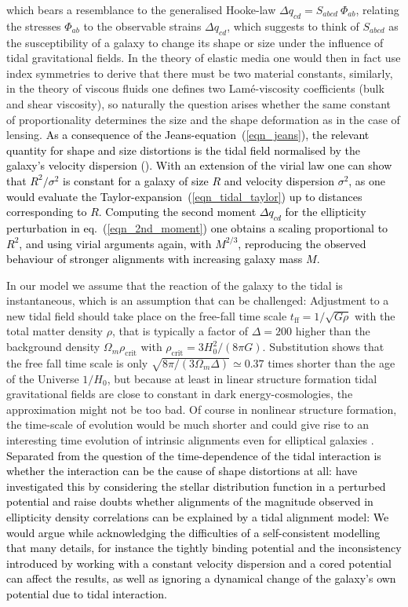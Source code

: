 \documentclass[a4paper,fleqn,usenatbib]{mnras}
\newcommand\spirou[1]{\textcolor{black}{#1}}
\begin{document}
which bears a resemblance to the generalised Hooke-law $\Delta q_{cd} = S_{abcd}\:\Phi_{ab}$, relating the stresses $\Phi_{ab}$ to the observable strains $\Delta q_{cd}$, which suggests to think of $S_{abcd}$ as the susceptibility of a galaxy to change its shape or size under the influence of tidal gravitational fields. In the theory of elastic media one would then in fact use index symmetries to derive that there must be two material constants, similarly, in the theory of viscous fluids one defines two Lam{\'e}-viscosity coefficients (bulk and shear viscosity), so naturally the question arises whether the same constant of proportionality determines the size and the shape deformation as in the case of lensing. \spirou{As a consequence of the Jeans-equation~(\ref{eqn_jeans}), the relevant quantity for shape and size distortions is the tidal field normalised by the galaxy's velocity dispersion (\citet{camelio_origin_2015,piras_mass_2018}). With an extension of the virial law one can show that $R^2/\sigma^2$ is constant for a galaxy of size $R$ and velocity dispersion $\sigma^2$, as one would evaluate the Taylor-expansion~(\ref{eqn_tidal_taylor}) up to distances corresponding to $R$. Computing the second moment $\Delta q_{cd}$ for the ellipticity perturbation in eq.~(\ref{eqn_2nd_moment}) one obtains a scaling proportional to $R^2$, and using virial arguments again, with $M^{2/3}$, reproducing the observed behaviour of stronger alignments with increasing galaxy mass $M$.}

In our model we assume that the reaction of the galaxy to the tidal is instantaneous, which is an assumption that can be challenged: Adjustment to a new tidal field should take place on the free-fall time scale $t_\mathrm{ff} = 1/\sqrt{G\rho}$ with the total matter density $\rho$, that is typically a factor of $\Delta = 200$ higher than the background density $\Omega_m\rho_\mathrm{crit}$ with $\rho_\mathrm{crit} = 3H_0^2/(8\pi G)$. Substitution shows that the free fall time scale is only $\sqrt{8\pi/(3\Omega_m\Delta)}\simeq 0.37$ times shorter than the age of the Universe $1/H_0$, but because at least in linear structure formation tidal gravitational fields are close to constant in dark energy-cosmologies, the approximation might not be too bad. Of course in nonlinear structure formation, the time-scale of evolution would be much shorter and could give rise to an interesting time evolution of intrinsic alignments even for elliptical galaxies \citep{lee_nonlinear_2007, schafer_galactic_2012, schmitz_time_2018}. \spirou{Separated from the question of the time-dependence of the tidal interaction is whether the interaction can be the cause of shape distortions at all: \citep{camelio_origin_2015} have investigated this by considering the stellar distribution function in a perturbed potential and raise doubts whether alignments of the magnitude observed in ellipticity density correlations can be explained by a tidal alignment model: We would argue while acknowledging the difficulties of a self-consistent modelling that many details, for instance the tightly binding potential and the inconsistency introduced by working with a constant velocity dispersion and a cored potential can affect the results, as well as ignoring a dynamical change of the galaxy's own potential due to tidal interaction.}
\end{document}
